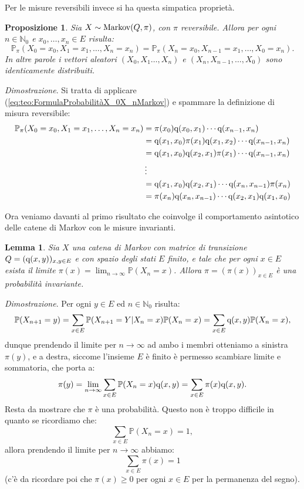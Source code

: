 \documentclass[11pt]{book}
\makeatletter
\theoremstyle{Definizione}
\theoremstyle{TeoremaProposizioneLemmaCorollario}
\newtheorem{mylem}[myteo]{Lemma}
\newtheorem{mypropo}[myteo]{Proposizione}
\theoremstyle{OsservazioneNota}
\renewenvironment{proof}[1][\proofname]{\par
  \normalfont \topsep6\p@\@plus6\p@\relax
  \trivlist
  \item[\hskip\labelsep
        \itshape
    #1\@addpunct{.}]\ignorespaces
}{%
  \endtrivlist\@endpefalse
}
\newcommand{\N}{\mathbb{N}}
\renewcommand{\P}{\mathbb{P}}
\newcommand{\q}{\textup{q}}
\renewenvironment{proof}{\textsl{Dimostrazione}.}{}
\makeatother
\begin{document}
Per le misure reversibili invece si ha questa simpatica proprietà.
\begin{boxpro}
\begin{mypropo}
Sia $X \sim \textup{Markov}(Q,\pi)$, con $\pi$ reversibile. Allora per ogni $n\in \N_0$ e $x_0,\dots,x_n\in E$ risulta:
$$
\P_\pi(X_0 = x_0, X_1 = x_1,\dots,X_n = x_n) = \P_\pi(X_n = x_0, X_{n-1} = x_1,\dots,X_0 = x_n).
$$
In altre parole i vettori aleatori $(X_0,X_1\dots,X_n)$ e $(X_n,X_{n-1},\dots,X_0)$ sono identicamente distribuiti.
\end{mypropo}
\tcblower
\begin{proof}
Si tratta di applicare (\ref{eq:teo:FormulaProbabilitàX_0X_nMarkov}) e spammare la definizione di misura reversibile:
\begin{align*}
\P_\pi(X_0 = x_0, X_1 = x_1,\dots,X_n = x_n) &= \pi(x_0)\q(x_0,x_1)\cdots \q(x_{n-1},x_n)\\
&= \q(x_1,x_0)\pi(x_1)\q(x_1,x_2)\cdots \q(x_{n-1},x_n)\\
&= \q(x_1,x_0)\q(x_2,x_1)\pi(x_1)\cdots \q(x_{n-1},x_n)\\
&{\,\vdots} \\
&= \q(x_1,x_0)\q(x_2,x_1)\cdots \q(x_n,x_{n-1}) \pi(x_n)\\
&= \pi(x_n)\q(x_n,x_{n-1})\cdots \q(x_2,x_1)\q(x_1,x_0)
\end{align*}
\end{proof}
\end{boxpro}
\noindent
Ora veniamo davanti al primo risultato che coinvolge il comportamento asintotico delle catene di Markov con le misure invarianti.
\begin{boxoss}
\begin{mylem}
Sia $X$ una catena di Markov con matrice di transizione $Q = (\q(x,y))_{x,y\in E}$ e con spazio degli stati $E$ finito, e tale che per ogni $x\in E$ esista il limite $\pi(x) = \lim_{n\to \infty} \P(X_n = x)$. Allora $\pi = (\pi(x))_{x\in E}$ è una probabilità invariante.
\end{mylem}
\tcblower
\begin{proof}
Per ogni $y\in E$ ed $n\in \N_0$ risulta:
$$
\P(X_{n+1} = y) = \sum_{x\in E} \P(X_{n+1} = Y| X_n = x)\P(X_n = x) = \sum_{x\in E} \q(x,y)\P(X_n = x),
$$
dunque prendendo il limite per $n\to \infty$ ad ambo i membri otteniamo a sinistra $\pi(y)$, e a destra, siccome l'insieme $E$ è finito è permesso scambiare limite e sommatoria, che porta a:
$$
\pi(y) = \lim_{n \to \infty} \sum_{x\in E} \P(X_n = x)\q(x,y) = \sum_{x\in E} \pi(x)\q(x,y).
$$
Resta da mostrare che $\pi$ è una probabilità. Questo non è troppo difficile in quanto se ricordiamo che:
$$
\sum_{x\in E} \P(X_n = x) = 1,
$$
allora prendendo il limite per $n \to \infty$ abbiamo:
$$
\sum_{x\in E} \pi(x) = 1
$$
(c'è da ricordare poi che $\pi(x) \geq 0$ per ogni $x\in E$ per la permanenza del segno).
\end{proof}
\end{boxoss}
\end{document}
